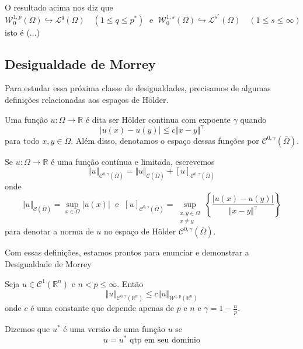 \documentclass[a4paper, 11pt]{book}
\theoremstyle{definition}
\newcommand{\bR}{\mathbb{R}}
\newcommand{\cC}{\mathcal{C}}
\newcommand{\cL}{\mathcal{L}}
\newcommand{\cW}{\mathcal{W}}
\begin{document}
O resultado acima nos diz que
\[
    \cW^{1,p}_0(\Omega) \hookrightarrow \cL^q(\Omega) \quad (1 \leqslant q \leqslant p^*) \;\text{ e }\; \cW^{1,s}_0(\Omega) \hookrightarrow \cL^{s^*}(\Omega) \quad (1 \leqslant s \leqslant \infty)
\]
isto é (...)

\subsection{Desigualdade de Morrey}

Para estudar essa próxima classe de desigualdades, precisamos de algumas definições relacionadas aos espaços de Hölder.

\begin{dbox}
    Uma função $u : \Omega \to \bR$ é dita ser Hölder continua com expoente $\gamma$ quando
    \[
        |u(x) - u(y)| \leqslant c \Vert x - y \Vert^\gamma
    \]
    para todo $x,y \in \Omega$. Além disso, denotamos o espaço dessas funções por $\cC^{0,\gamma}(\overline\Omega)$.
\end{dbox}

\begin{dbox}
    Se $u : \Omega \to \bR$ é uma função contínua e limitada, escrevemos
    \[
        \Vert u \Vert_{\cC^{0,\gamma}(\overline\Omega)} = \Vert u \Vert_{\cC(\overline\Omega)} + [u]_{\cC^{0,\gamma}(\overline\Omega)}
    \]
    onde
    \[
        \Vert u \Vert_{\cC(\overline\Omega)} = \sup_{x \in \Omega} |u(x)| \;\text{ e }\; [u]_{\cC^{0,\gamma}(\overline\Omega)} = \sup_{\substack{x,y \in \Omega\\x \neq y}} \left\{ \frac{|u(x) - u(y)|}{\Vert x - y \Vert^\gamma} \right\}
    \]
    para denotar a norma de $u$ no espaço de Hölder $\cC^{0,\gamma}(\overline\Omega)$.
\end{dbox}

Com essas definições, estamos prontos para enunciar e demonstrar a Desigualdade de Morrey

\begin{tbox} \label{thm:holdersobolev1}
    Seja $u \in \cC^1(\bR^n)$ e $n < p \leqslant \infty$. Então
    \[
        \Vert u \Vert_{\cC^{0,\gamma}(\bR^n)} \leqslant c \Vert u \Vert_{\cW^{1,p}(\bR^n)}
    \]
    onde $c$ é uma constante que depende apenas de $p$ e $n$ e $\gamma = 1 - \frac{n}{p}$.
\end{tbox}
\begin{prf}
    
\end{prf}

\begin{dbox}
    Dizemos que $u^*$ é uma versão de uma função $u$ se
    \[
        u = u^* \text{ qtp em seu domínio}
    \]
\end{dbox}
\end{document}
